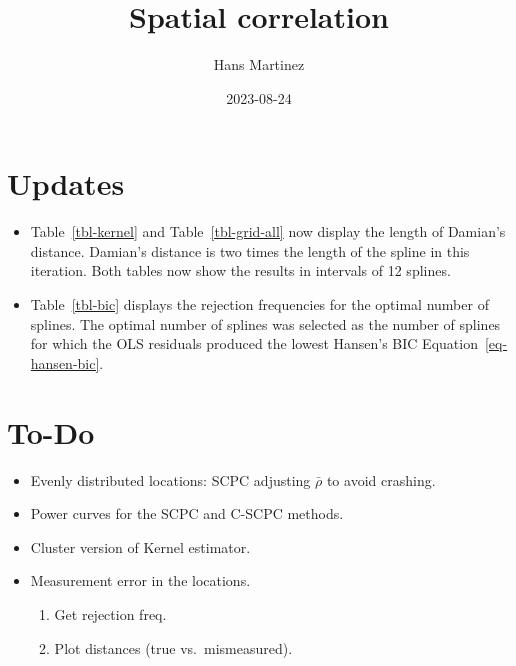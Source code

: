 \documentclass[
]{article}
\title{Spatial correlation}
\author{Hans Martinez}
\date{2023-08-24}
\providecommand{\tightlist}{%
  \setlength{\itemsep}{0pt}\setlength{\parskip}{0pt}}\usepackage{longtable,booktabs,array}
\begin{document}
\maketitle
\ifdefined\Shaded\renewenvironment{Shaded}{\begin{tcolorbox}[boxrule=0pt, frame hidden, enhanced, borderline west={3pt}{0pt}{shadecolor}, interior hidden, breakable, sharp corners]}{\end{tcolorbox}}\fi

\hypertarget{updates}{%
\section*{Updates}\label{updates}}

\begin{itemize}
\item
  Table~\ref{tbl-kernel} and Table~\ref{tbl-grid-all} now display the
  length of Damian's distance. Damian's distance is two times the length
  of the spline in this iteration. Both tables now show the results in
  intervals of 12 splines.
\item
  Table~\ref{tbl-bic} displays the rejection frequencies for the optimal
  number of splines. The optimal number of splines was selected as the
  number of splines for which the OLS residuals produced the lowest
  Hansen's BIC Equation~\ref{eq-hansen-bic}.
\end{itemize}

\hypertarget{to-do}{%
\section*{To-Do}\label{to-do}}

\begin{itemize}
\tightlist
\item
  Evenly distributed locations: SCPC adjusting \(\bar\rho\) to avoid
  crashing.
\item
  Power curves for the SCPC and C-SCPC methods.
\item
  Cluster version of Kernel estimator.
\item
  Measurement error in the locations.

  \begin{enumerate}
  \def\labelenumi{\alph{enumi}.}
  \tightlist
  \item
    Get rejection freq.
  \item
    Plot distances (true vs.~mismeasured).
  \end{enumerate}
\end{itemize}
\end{document}
